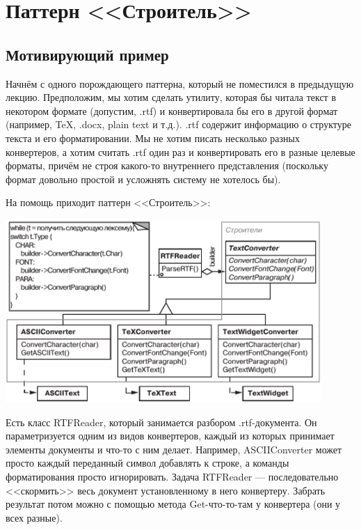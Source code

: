 \documentclass{../../text-style}
\begin{document}
\maketitle
\thispagestyle{empty}

\section{Паттерн <<Строитель>>}

\subsection{Мотивирующий пример}

Начнём с одного порождающего паттерна, который не поместился в предыдущую лекцию. Предположим, мы хотим сделать утилиту, которая бы читала текст в некотором формате (допустим, .rtf) и конвертировала бы его в другой формат (например, TeX, .docx, plain text и т.д.). .rtf содержит информацию о структуре текста и его форматировании. Мы не хотим писать несколько разных конвертеров, а хотим считать .rtf один раз и конвертировать его в разные целевые форматы, причём не строя какого-то внутреннего представления (поскольку формат довольно простой и усложнять систему не хотелось бы).

На помощь приходит паттерн <<Строитель>>:

\begin{center}
    \includegraphics[width=0.9\textwidth]{textConverter.png}
\end{center}

Есть класс RTFReader, который занимается разбором .rtf-документа. Он параметризуется одним из видов конвертеров, каждый из которых принимает элементы документы и что-то с ним делает. Например, ASCIIConverter может просто каждый переданный символ добавлять к строке, а команды форматирования просто игнорировать. Задача RTFReader --- последовательно <<скормить>> весь документ установленному в него конвертеру. Забрать результат потом можно с помощью метода Get-что-то-там у конвертера (они у всех разные).
\end{document}
